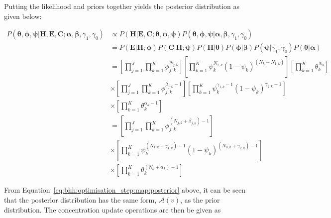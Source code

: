 Putting the likelihood and priors together yields the posterior distribution as given below:

\footnotesize
\begin{equation}
      \label{eq:bhh:optimisation_step:map:posterior}
      \begin{split}
            P(\boldsymbol{\theta}, \boldsymbol{\phi}, \boldsymbol{\psi} \vert \boldsymbol{H}, \boldsymbol{E}, \boldsymbol{C};  \boldsymbol{\alpha}, \boldsymbol{\beta}, \gamma_{1}, \gamma_{0})
            &\propto P(\boldsymbol{H} \vert \boldsymbol{E}, \boldsymbol{C}; \boldsymbol{\theta}, \boldsymbol{\phi}, \boldsymbol{\psi})P(\boldsymbol{\theta}, \boldsymbol{\phi}, \boldsymbol{\psi} \vert \boldsymbol{\alpha}, \boldsymbol{\beta}, \gamma_{1}, \gamma_{0}) \\
            &= P(\boldsymbol{E} \vert \boldsymbol{H}; \boldsymbol{\phi}) P(\boldsymbol{C} \vert \boldsymbol{H}; \boldsymbol{\psi}) P(\boldsymbol{H} \vert \boldsymbol{\theta}) P(\boldsymbol{\phi} \vert \boldsymbol{\beta}) P(\boldsymbol{\psi} \vert \gamma_{1}, \gamma_{0}) P(\boldsymbol{\theta} \vert \boldsymbol{\alpha})  \\
            &= \left[ \prod_{j=1}^{J} \prod_{k=1}^{K} \phi_{j,k}^{N_{j,k}} \right] \left[ \prod_{k=1}^{K} \psi_{k}^{N_{1,k}} (1 - \psi_{k})^{(N_{k} - N_{1,k})} \right] \left[ \prod_{k=1}^{K} \theta_{k}^{N_{k}} \right] \\
            &\times \left[ \prod_{j=1}^{J} \prod_{k=1}^{K} \phi_{j,k}^{\beta_{j,k} - 1} \right] \left[ \prod_{k=1}^{K} \psi_{k}^{\gamma_{1,k} - 1} (1 - \psi_{k})^{\gamma_{2,k} - 1} \right] \\
            &\times \left[ \prod_{k=1}^{K} \theta_{k}^{\alpha_{k} - 1} \right] \\
            &= \left[ \prod_{j=1}^{J} \prod_{k=1}^{K} \phi_{j,k}^{(N_{j,k} + \beta_{j,k}) - 1} \right] \\
            &\times \left[ \prod_{k=1}^{K} \psi_{k}^{(N_{1,k} + \gamma_{1,k}) - 1} (1 - \psi_{k})^{(N_{0,k} + \gamma_{2,k} )- 1} \right] \\
            &\times \left[ \prod_{k=1}^{K} \theta_{k}^{(N_{k} + \alpha_{k}) - 1} \right]
      \end{split}
\end{equation}
\normalsize

From Equation~\eqref{eq:bhh:optimisation_step:map:posterior} above, it can be seen that the posterior distribution has the same form, $\mathcal{A}(v)$, as the prior distribution. The concentration update operations are then be given as

